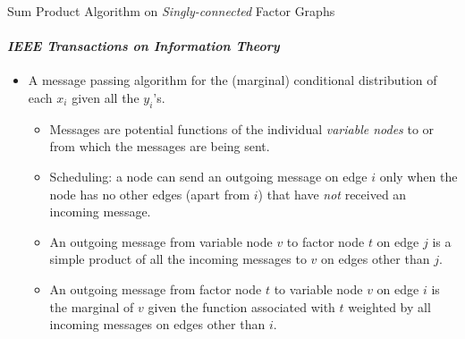 \documentclass[letter,graphicx]{beamer}
\begin{document}
 \begin{frame}{\large Sum Product Algorithm on {\em Singly-connected} Factor Graphs}
 \framesubtitle{\citet{kschischang2001factor} {\em IEEE Transactions on Information Theory}}
 \begin{itemize}
 	\item A message passing algorithm for the (marginal) conditional distribution of each $x_i$ given all the $y_i$'s.
 	\begin{itemize}
 		\item Messages are potential functions of the individual {\em variable nodes} to or from which the messages are being sent.
 		\item Scheduling: a node can send an outgoing message on edge $i$ only when the node has no other edges (apart from $i$) that have {\em not} received an incoming message.
		 \item An outgoing message from variable node $v$ to factor node $t$ on edge $j$ is a simple product of all the incoming messages to $v$ on edges other than $j$.
 		\item An outgoing message from factor node $t$ to variable node $v$ on edge $i$ is the marginal of $v$ given the function associated with $t$ weighted by all incoming messages on edges other than $i$.
 	\end{itemize}
 \end{itemize}
 \end{frame}
\end{document}
